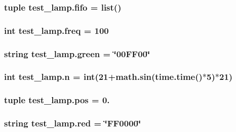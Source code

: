 \subsubsection[{fifo}]{\setlength{\rightskip}{0pt plus 5cm}tuple test\+\_\+lamp.\+fifo = list()}\label{namespacetest__lamp_a3f074fe7b6f4e5692ca115354c4b282f}
\hypertarget{namespacetest__lamp_a96ed73138b4ac9b56fa6756621f158ae}{}
\subsubsection[{freq}]{\setlength{\rightskip}{0pt plus 5cm}int test\+\_\+lamp.\+freq = 100}\label{namespacetest__lamp_a96ed73138b4ac9b56fa6756621f158ae}
\hypertarget{namespacetest__lamp_a51fd2448d3bc03744f0811a13cbaa0ef}{}
\subsubsection[{green}]{\setlength{\rightskip}{0pt plus 5cm}string test\+\_\+lamp.\+green = \char`\"{}00\+F\+F00\char`\"{}}\label{namespacetest__lamp_a51fd2448d3bc03744f0811a13cbaa0ef}
\hypertarget{namespacetest__lamp_a9b344035322439e65e32b1f0f633b250}{}
\subsubsection[{n}]{\setlength{\rightskip}{0pt plus 5cm}int test\+\_\+lamp.\+n = int(21+math.\+sin(time.\+time()$\ast$5)$\ast$21)}\label{namespacetest__lamp_a9b344035322439e65e32b1f0f633b250}
\hypertarget{namespacetest__lamp_a065ccc382a9d2863201219bfa7e22130}{}
\subsubsection[{pos}]{\setlength{\rightskip}{0pt plus 5cm}tuple test\+\_\+lamp.\+pos = 0.}\label{namespacetest__lamp_a065ccc382a9d2863201219bfa7e22130}
\hypertarget{namespacetest__lamp_a1bbf62187c72933bcb170bb50c8566cf}{}
\subsubsection[{red}]{\setlength{\rightskip}{0pt plus 5cm}string test\+\_\+lamp.\+red = \char`\"{}F\+F0000\char`\"{}}\label{namespacetest__lamp_a1bbf62187c72933bcb170bb50c8566cf}
\hypertarget{namespacetest__lamp_a2a800f9adfbfa469a4512743d36bd781}{}
